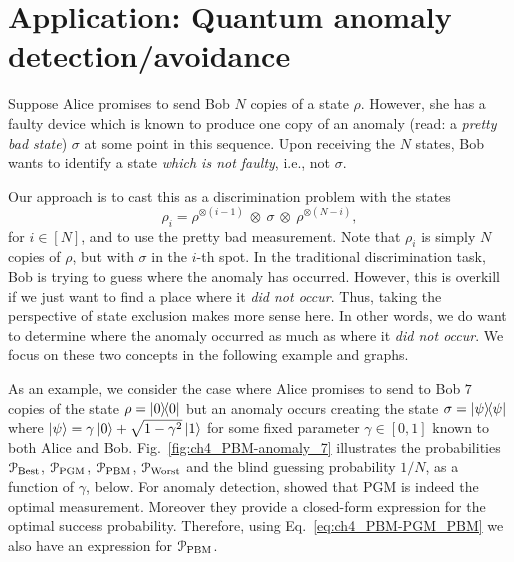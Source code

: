 \section{Application: Quantum anomaly detection/avoidance} \label{sec:ch4_PBM-anomaly}

Suppose Alice promises to send Bob $N$ copies of a state $\rho$. 
However, she has a faulty device which is known to produce one copy of an anomaly (read: a \emph{pretty bad state}) $\sigma$ at some point in this sequence. 
Upon receiving the $N$ states, Bob wants to identify a state \emph{which is not faulty}, i.e., not $\sigma$. 

Our approach is to cast this as a discrimination problem with the states 
$$\rho_i = \rho^{\otimes (i-1)}\ \otimes\ \sigma\ \otimes\ \rho^{\otimes (N-i)},$$
for $i \in [N]$, and to use the pretty bad measurement. 
Note that $\rho_i$ is simply $N$ copies of $\rho$, but with $\sigma$ in the $i$-th spot. 
In the traditional discrimination task, Bob is trying to guess where the anomaly has occurred.
However, this is overkill if we just want to find a place where it \emph{did not occur}. 
Thus, taking the perspective of state exclusion makes more sense here. 
In other words, we do want to determine where the anomaly occurred as much as where it \emph{did not occur}. 
We focus on these two concepts in the following example and graphs. 

As an example, we consider the case where Alice promises to send to Bob $7$ copies of the state $\rho = \ketbra{0}{0}$ but an anomaly occurs creating the state $\sigma = \ketbra{\psi}{\psi}$ where $\ket{\psi} = \gamma \ket{0} + \sqrt{1 - \gamma^2} \ket{1}$ for some fixed parameter $\gamma \in [0,1]$ known to both Alice and Bob. 
Fig.~\ref{fig:ch4_PBM-anomaly_7} illustrates the probabilities $\mathcal{P}_{\mathrm{Best}}$, $\mathcal{P}_{\mathrm{PGM}}$, $\mathcal{P}_{\mathrm{PBM}}$, $\mathcal{P}_{\mathrm{Worst}}$ and the blind guessing probability $1/N$, as a function of $\gamma$, below. 
For anomaly detection, \cite{llorens2024quantum, skotiniotis2018identification} showed that PGM is indeed the optimal measurement. Moreover they provide a closed-form expression for the optimal success probability. Therefore, using Eq.~\eqref{eq:ch4_PBM-PGM_PBM} we also have an expression for $\mathcal{P}_{\mathrm{PBM}}$.

